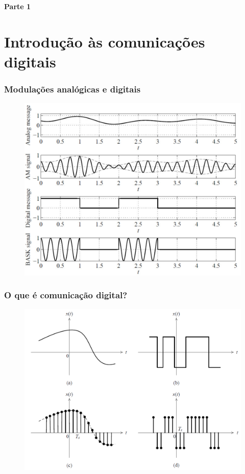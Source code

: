 
\begin{frame}
	\begin{block}{\centering\large\bfseries Parte 1}
		\centering\large\insertpart
	\end{block}
\end{frame}

\section{Introdução às comunicações digitais}

\begin{frame}
	\frametitle{Modulações analógicas e digitais}

	\begin{figure}[t]
	  \begin{center}
	    \includegraphics[width=0.77\columnwidth]{figs/fig01}
	  \end{center}
	\end{figure}

\end{frame}

\begin{frame}
    \frametitle{O que é comunicação digital?}
    
    \begin{figure}[t]
	  \begin{center}
	    \includegraphics[width=0.77\columnwidth]{figs/fig02}
	  \end{center}
	\end{figure}
\end{frame}

